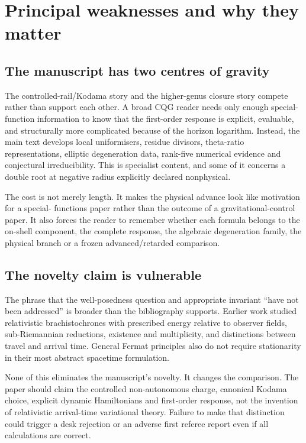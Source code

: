 \documentclass[11pt,a4paper]{article}
\begin{document}
\section{Principal weaknesses and why they matter}

\subsection{The manuscript has two centres of gravity}

The controlled-rail/Kodama story and the higher-genus closure story compete rather than support
each other.  A broad CQG reader needs only enough special-function information to know that the
first-order response is explicit, evaluable, and structurally more complicated because of the
horizon logarithm.  Instead, the main text develops local uniformisers, residue divisors,
theta-ratio representations, elliptic degeneration data, rank-five numerical evidence and
conjectural irreducibility.  This is specialist content, and some of it concerns a double root at
negative radius explicitly declared nonphysical.

The cost is not merely length.  It makes the physical advance look like motivation for a special-
functions paper rather than the outcome of a gravitational-control paper.  It also forces the
reader to remember whether each formula belongs to the on-shell component, the complete response,
the algebraic degeneration family, the physical branch or a frozen advanced/retarded comparison.

\subsection{The novelty claim is vulnerable}

The phrase that the well-posedness question and appropriate invariant ``have not been addressed''
is broader than the bibliography supports.  Earlier work studied relativistic brachistochrones
with prescribed energy relative to observer fields, sub-Riemannian reductions, existence and
multiplicity, and distinctions between travel and arrival time.  General Fermat principles also
do not require stationarity in their most abstract spacetime formulation.

None of this eliminates the manuscript's novelty.  It changes the comparison.  The paper should
claim the controlled non-autonomous charge, canonical Kodama choice, explicit dynamic
Hamiltonians and first-order response, not the invention of relativistic arrival-time
variational theory.  Failure to make that distinction could trigger a desk rejection or an
adverse first referee report even if all calculations are correct.
\end{document}
